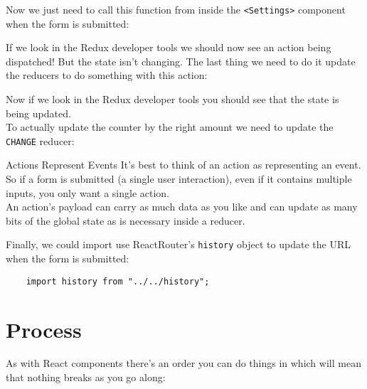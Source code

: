 
Now we just need to call this function from inside the \texttt{<Settings>} component when the form is submitted:


If we look in the Redux developer tools we should now see an action being dispatched! But the state isn't changing. The last thing we need to do it update the reducers to do something with this action:


Now if we look in the Redux developer tools you should see that the state is being updated.
\\

To actually update the counter by the right amount we need to update the \texttt{CHANGE} reducer:



\begin{infobox}{Actions Represent Events}
    It's best to think of an action as representing an event. So if a form is submitted (a single user interaction), even if it contains multiple inputs, you only want a single action.
    \\

    An action's payload can carry as much data as you like and can update as many bits of the global state as is necessary inside a reducer.
\end{infobox}


Finally, we could import use ReactRouter's \texttt{history} object to update the URL when the form is submitted:

\begin{verbatim}
    import history from "../../history";
\end{verbatim}




\section{Process}

As with React components there's an order you can do things in which will mean that nothing breaks as you go along:

